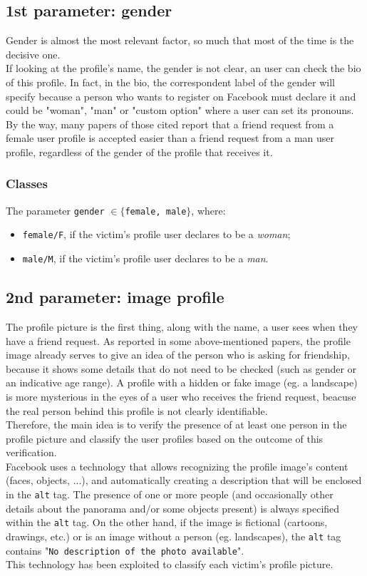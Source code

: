 \subsection{1st parameter: gender}
Gender is almost the most relevant factor, so much that most of the time is the decisive one.\\
If looking at the profile's name, the gender is not clear, an user can check the bio of this profile. In fact, in the bio, the correspondent label of the gender will specify because a person who wants to register on Facebook must declare it and could be "woman", "man" or "custom option" where a user can set its pronouns. \\
By the way, many papers of those cited report that a friend request from a female user profile is accepted easier than a friend request from a man user profile, regardless of the gender of the profile that receives it.
\subsubsection*{Classes}
The parameter \texttt{gender} $ \in \{$\texttt{female, male}$\}$, where: 
\begin{itemize}
	\item \texttt{female/F}, if the victim's profile user declares to be a \textit{woman};
	\item \texttt{male/M}, if the victim's profile user declares to be a \textit{man}.
\end{itemize}
\subsection{2nd parameter: image profile}
\label{cap:alt-technology}
The profile picture is the first thing, along with the name, a user sees when they have a friend request. As reported in some above-mentioned papers, the profile image already serves to give an idea of the person who is asking for friendship, because it shows some details that do not need to be checked (such as gender or an indicative age range).
A profile with a hidden or fake image (eg. a landscape) is more mysterious in the eyes of a user who receives the friend request, beacuse the real person behind this profile is not clearly identifiable.\\
Therefore, the main idea is to verify the presence of at least one person in the profile picture and classify the user profiles based on the outcome of this verification.\\
Facebook uses a technology that allows recognizing the profile image's content (faces, objects, ...), and automatically creating a description that will be enclosed in the \texttt{alt} tag. 
The presence of one or more people (and occasionally other details about the panorama and/or some objects present) is always specified within the \texttt{alt} tag. On the other hand, if the image is fictional (cartoons, drawings, etc.) or is an image without a person (eg. landscapes), the \texttt{alt} tag contains "\texttt{No description of the photo available}".\\
This technology has been exploited to classify each victim's profile picture.
